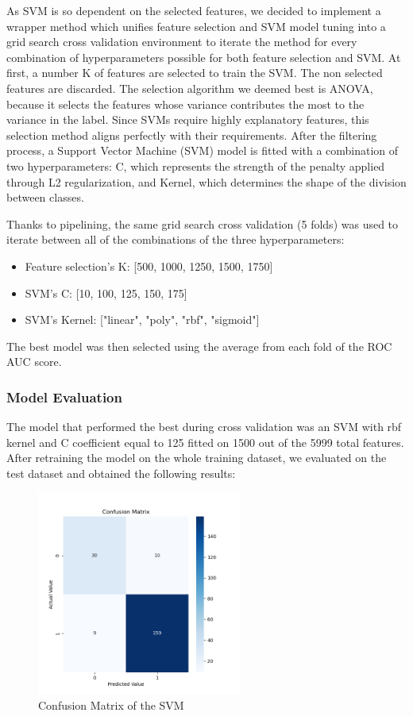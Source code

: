 \documentclass{article}
\begin{document}
As SVM is so dependent on the selected features, we decided to implement a wrapper method which unifies feature selection and SVM model tuning into a grid search cross validation environment to iterate the method for every combination of hyperparameters possible for both feature selection and SVM. At first, a number K of features are selected to train the SVM. The non selected features are discarded. The selection algorithm we deemed best is ANOVA, because it selects the features whose variance contributes the most to the variance in the label. Since SVMs require highly explanatory features, this selection method aligns perfectly with their requirements. After the filtering process, a Support Vector Machine (SVM) model is fitted with a combination of two hyperparameters: C, which represents the strength of the penalty applied through L2 regularization, and Kernel, which determines the shape of the division between classes.

Thanks to pipelining, the same grid search cross validation (5 folds) was used to iterate between all of the combinations of the three hyperparameters:
 
\begin{itemize}
  \item Feature selection's K: [500, 1000, 1250, 1500, 1750]
  \item SVM's C: [10, 100, 125, 150, 175]
  \item SVM's Kernel: ["linear", "poly", "rbf", "sigmoid"]
\end{itemize}

The best model was then selected using the average from each fold of the ROC AUC score. 

\subsubsection{Model Evaluation}

The model that performed the best during cross validation was an SVM with rbf kernel and C coefficient equal to 125 fitted on 1500 out of the 5999 total features. After retraining the model on the whole training dataset, we evaluated on the test dataset and obtained the following results:

\begin{figure}[h]
	\centering
	\includegraphics[width=0.6\textwidth]{confusion_matrix_SVM.png}
	 \vspace{-1em}
	\caption{Confusion Matrix of the SVM}
\end{figure}
\end{document}
